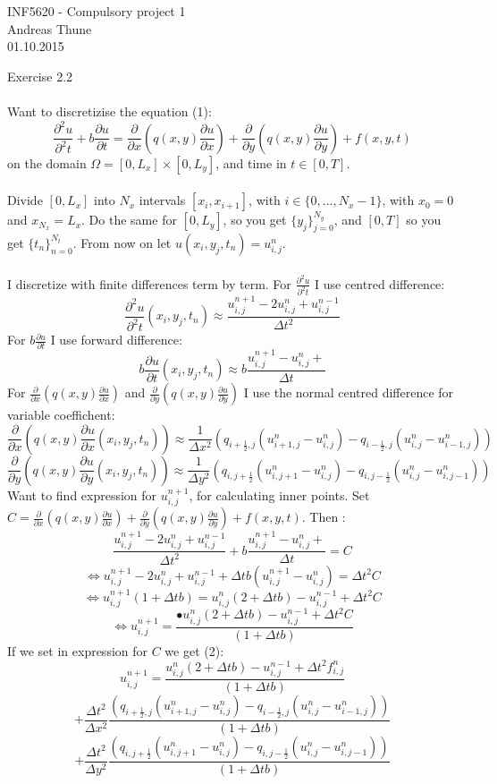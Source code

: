 \documentclass[11pt,a4paper]{report}
\begin{document}
\begin{center}
\LARGE INF5620 - Compulsory project 1
\\
Andreas Thune
\\
\LARGE
01.10.2015

\end{center}

Exercise 2.2
\\
\\
Want to discretizise the equation (1): $$ \frac{\partial^2 u}{\partial^2 t} + b\frac{\partial u}{\partial t} = \frac{\partial }{\partial x}(q(x,y)\frac{\partial u}{\partial x}) + \frac{\partial }{\partial y}(q(x,y)\frac{\partial u}{\partial y}) + f(x,y,t)$$ on the domain $\Omega=[0,L_x]\times [0,L_y]$, and time in $t\in [0,T]$.
\\
\\
Divide $[0,L_x]$ into $N_x$ intervals $[x_i,x_{i+1}]$, with $i \in \{0,...,N_x-1\}$, with $x_0=0$ and $x_{N_x}=L_x$. Do the same for $[0,L_y]$, so you get $\{y_j \}_{j=0}^{N_y}$, and $[0,T]$ so you get $\{t_n \}_{n=0}^{N_t}$. From now on let $u(x_i,y_j,t_n)=u_{i,j}^n$.
\\
\\  
I discretize with finite differences term by term. For $ \frac{\partial^2 u}{\partial^2 t}$ I use centred difference: $$\frac{\partial^2 u}{\partial^2 t}(x_i,y_j,t_n) \approx \frac{u_{i,j}^{n+1}-2u_{i,j}^n+u_{i,j}^{n-1}}{\Delta t^2} $$ For $b\frac{\partial u}{\partial t}$ I use forward difference: $$b\frac{\partial u}{\partial t}(x_i,y_j,t_n) \approx b\frac{u_{i,j}^{n+1}-u_{i,j}^n+}{\Delta t} $$ For $\frac{\partial }{\partial x}(q(x,y)\frac{\partial u}{\partial x})$ and $ \frac{\partial }{\partial y}(q(x,y)\frac{\partial u}{\partial y})$ I use the normal centred difference for variable coeffichent: $$\frac{\partial }{\partial x}(q(x,y)\frac{\partial u}{\partial x}(x_i,y_j,t_n)) \approx \frac{1}{\Delta x^2}(q_{i+\frac{1}{2},j}(u_{i+1,j}^{n}-u_{i,j}^{n})-q_{i-\frac{1}{2},j}(u_{i,j}^{n}-u_{i-1,j}^{n}))$$ 
$$\frac{\partial }{\partial y}(q(x,y)\frac{\partial u}{\partial y}(x_i,y_j,t_n)) \approx \frac{1}{\Delta y^2}(q_{i,j+\frac{1}{2}}(u_{i,j+1}^{n}-u_{i,j}^{n})-q_{i,j-\frac{1}{2}}(u_{i,j}^{n}-u_{i,j-1}^{n}))$$
Want to find expression for $u_{i,j}^{n+1}$, for calculating inner points. Set $C=\frac{\partial }{\partial x}(q(x,y)\frac{\partial u}{\partial x}) +\frac{\partial }{\partial y}(q(x,y)\frac{\partial u}{\partial y})+f(x,y,t)$. Then : $$ \frac{u_{i,j}^{n+1}-2u_{i,j}^n+u_{i,j}^{n-1}}{\Delta t^2} + b\frac{u_{i,j}^{n+1}-u_{i,j}^n+}{\Delta t} =C $$ $$ \iff u_{i,j}^{n+1}-2u_{i,j}^n+u_{i,j}^{n-1} +\Delta t b(u_{i,j}^{n+1}-u_{i,j}^n)=\Delta t^2 C $$ $$ \iff u_{i,j}^{n+1}(1+\Delta t b)=u_{i,j}^n(2+\Delta t b)-u_{i,j}^{n-1}+\Delta t^2 C$$ $$\iff u_{i,j}^{n+1}=\frac{•u_{i,j}^n(2+\Delta t b)-u_{i,j}^{n-1}+\Delta t^2 C}{(1+\Delta t b)} $$  If we set in expression for $C$ we get (2): $$u_{i,j}^{n+1}=\frac{u_{i,j}^n(2+\Delta t b)-u_{i,j}^{n-1}+\Delta t^2 f_{i,j}^n}{(1+\Delta t b)} $$ $$ + \frac{\Delta t^2}{\Delta x^2}\frac{(q_{i+\frac{1}{2},j}(u_{i+1,j}^{n}-u_{i,j}^{n})-q_{i-\frac{1}{2},j}(u_{i,j}^{n}-u_{i-1,j}^{n}))}{(1+\Delta t b)} $$ $$+ \frac{\Delta t^2}{\Delta y^2}\frac{(q_{i,j+\frac{1}{2}}(u_{i,j+1}^{n}-u_{i,j}^{n})-q_{i,j-\frac{1}{2}}(u_{i,j}^{n}-u_{i,j-1}^{n}))}{(1+\Delta t b)} $$
\end{document}
